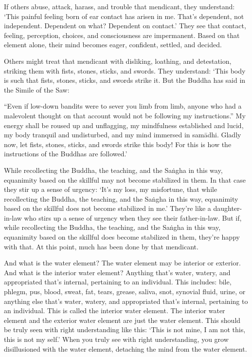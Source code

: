 \documentclass[12pt,openany]{book}%
\begin{document}
If others abuse, attack, harass, and trouble that mendicant, they understand: ‘This painful feeling born of ear contact has arisen in me. That’s dependent, not independent. Dependent on what? Dependent on contact.’ They see that contact, feeling, perception, choices, and consciousness are impermanent. Based on that element alone, their mind becomes eager, confident, settled, and decided. 

Others might treat that mendicant with disliking, loathing, and detestation, striking them with fists, stones, sticks, and swords. They understand: ‘This body is such that fists, stones, sticks, and swords strike it. But the Buddha has said in the Simile of the Saw: 

“Even if low-down bandits were to sever you limb from limb, anyone who had a malevolent thought on that account would not be following my instructions.” My energy shall be roused up and unflagging, my mindfulness established and lucid, my body tranquil and undisturbed, and my mind immersed in \textsanskrit{samādhi}. Gladly now, let fists, stones, sticks, and swords strike this body! For this is how the instructions of the Buddhas are followed.’ 

While recollecting the Buddha, the teaching, and the \textsanskrit{Saṅgha} in this way, equanimity based on the skillful may not become stabilized in them. In that case they stir up a sense of urgency: ‘It’s my loss, my misfortune, that while recollecting the Buddha, the teaching, and the \textsanskrit{Saṅgha} in this way, equanimity based on the skillful does not become stabilized in me.’ They’re like a daughter-in-law who stirs up a sense of urgency when they see their father-in-law. But if, while recollecting the Buddha, the teaching, and the \textsanskrit{Saṅgha} in this way, equanimity based on the skillful does become stabilized in them, they’re happy with that. At this point, much has been done by that mendicant. 

And what is the water element? The water element may be interior or exterior. And what is the interior water element? Anything that’s water, watery, and appropriated that’s internal, pertaining to an individual. This includes: bile, phlegm, pus, blood, sweat, fat, tears, grease, saliva, snot, synovial fluid, urine, or anything else that’s water, watery, and appropriated that’s internal, pertaining to an individual. This is called the interior water element. The interior water element and the exterior water element are just the water element. This should be truly seen with right understanding like this: ‘This is not mine, I am not this, this is not my self.’ When you truly see with right understanding, you grow disillusioned with the water element, detaching the mind from the water element. 
\end{document}
